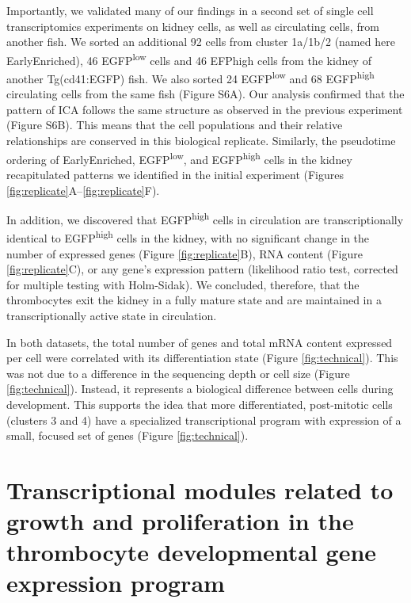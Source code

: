 Importantly, we validated many of our findings in a second set of single cell transcriptomics experiments on kidney cells, as well as circulating cells, from another fish. We sorted an additional 92 cells from cluster 1a/1b/2 (named here EarlyEnriched), 46 EGFP\textsuperscript{low} cells and 46 EFPhigh cells from the kidney of another Tg(cd41:EGFP) fish. We also sorted 24 EGFP\textsuperscript{low} and 68 EGFP\textsuperscript{high} circulating cells from the same fish (Figure S6A). Our analysis confirmed that the pattern of ICA follows the same structure as observed in the previous experiment (Figure S6B). This means that the cell populations and their relative relationships are conserved in this biological replicate. Similarly, the pseudotime ordering of EarlyEnriched, EGFP\textsuperscript{low}, and EGFP\textsuperscript{high} cells in the kidney recapitulated patterns we identified in the initial experiment (Figures \ref{fig:replicate}A–\ref{fig:replicate}F).

In addition, we discovered that EGFP\textsuperscript{high} cells in circulation are transcriptionally identical to EGFP\textsuperscript{high} cells in the kidney, with no significant change in the number of expressed genes (Figure \ref{fig:replicate}B), RNA content (Figure \ref{fig:replicate}C), or any gene’s expression pattern (likelihood ratio test, corrected for multiple testing with Holm-Sidak). We concluded, therefore, that the thrombocytes exit the kidney in a fully mature state and are maintained in a transcriptionally active state in circulation.

In both datasets, the total number of genes and total mRNA content expressed per cell were correlated with its differentiation state (Figure \ref{fig:technical}). This was not due to a difference in the sequencing depth or cell size (Figure \ref{fig:technical}). Instead, it represents a biological difference between cells during development. This supports the idea that more differentiated, post-mitotic cells (clusters 3 and 4) have a specialized transcriptional program with expression of a small, focused set of genes (Figure \ref{fig:technical}).

\section{Transcriptional modules related to growth and proliferation in the thrombocyte developmental gene expression program}

